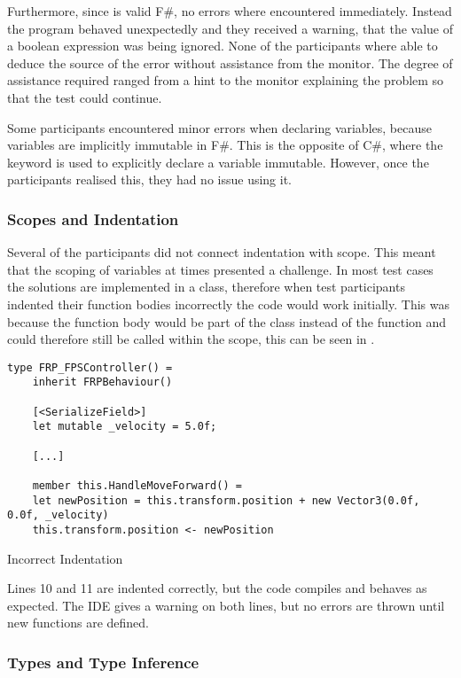 Furthermore, since  is valid F\#, no errors where encountered immediately. Instead the program behaved unexpectedly and they received a warning, that the value of a boolean expression was being ignored. None of the participants where able to deduce the source of the error without assistance from the monitor. The degree of assistance required ranged from a hint to the monitor explaining the problem so that the test could continue.

Some participants encountered minor errors when declaring variables, because variables are implicitly immutable in F\#. This is the opposite of C\#, where the  keyword is used to explicitly declare a variable immutable. However, once the participants realised this, they had no issue using it.

\subsubsection{Scopes and Indentation}
Several of the participants did not connect indentation with scope. This meant that the scoping of variables at times presented a challenge. In most test cases the solutions are implemented in a class, therefore when test participants indented their function bodies incorrectly the code would work initially. This was because the function body would be part of the class instead of the function and could therefore still be called within the scope, this can be seen in .

\begin{listing}[H]
\begin{verbatim}
type FRP_FPSController() =
    inherit FRPBehaviour()

    [<SerializeField>]
    let mutable _velocity = 5.0f;

    [...]

    member this.HandleMoveForward() =
    let newPosition = this.transform.position + new Vector3(0.0f, 0.0f, _velocity)
    this.transform.position <- newPosition
\end{verbatim}
\caption{Incorrect Indentation}
\label{lst:scope-prob}
\end{listing}

Lines 10 and 11 are indented correctly, but the code compiles and behaves as expected. The \gls{IDE} gives a warning on both lines, but no errors are thrown until new  functions are defined.

\subsubsection{Types and Type Inference}


